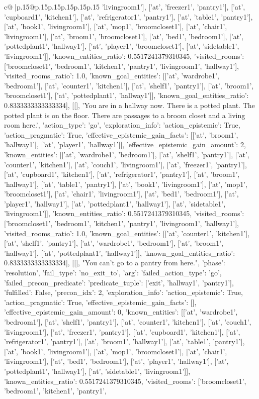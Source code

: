 \documentclass{article}
\begin{document}
{\begin{supertabular}{c@{$\;$}|p{.15\linewidth}@{}p{.15\linewidth}p{.15\linewidth}p{.15\linewidth}p{.15\linewidth}p{.15\linewidth}}
{{{'livingroom1'], ['at', 'freezer1', 'pantry1'], ['at', 'cupboard1', 'kitchen1'], ['at', 'refrigerator1', 'pantry1'], ['at', 'table1', 'pantry1'], ['at', 'book1', 'livingroom1'], ['at', 'mop1', 'broomcloset1'], ['at', 'chair1', 'livingroom1'], ['at', 'broom1', 'broomcloset1'], ['at', 'bed1', 'bedroom1'], ['at', 'pottedplant1', 'hallway1'], ['at', 'player1', 'broomcloset1'], ['at', 'sidetable1', 'livingroom1']], 'known_entities_ratio': 0.5517241379310345, 'visited_rooms': ['broomcloset1', 'bedroom1', 'kitchen1', 'pantry1', 'livingroom1', 'hallway1'], 'visited_rooms_ratio': 1.0, 'known_goal_entities': [['at', 'wardrobe1', 'bedroom1'], ['at', 'counter1', 'kitchen1'], ['at', 'shelf1', 'pantry1'], ['at', 'broom1', 'broomcloset1'], ['at', 'pottedplant1', 'hallway1']], 'known_goal_entities_ratio': 0.8333333333333334}}], [[], 'You are in a hallway now. There is a potted plant. The potted plant is on the floor. There are passages to a broom closet and a living room here.', {'action_type': 'go', 'exploration_info': {'action_epistemic': True, 'action_pragmatic': True, 'effective_epistemic_gain_facts': [['at', 'broom1', 'hallway1'], ['at', 'player1', 'hallway1']], 'effective_epistemic_gain_amount': 2, 'known_entities': [['at', 'wardrobe1', 'bedroom1'], ['at', 'shelf1', 'pantry1'], ['at', 'counter1', 'kitchen1'], ['at', 'couch1', 'livingroom1'], ['at', 'freezer1', 'pantry1'], ['at', 'cupboard1', 'kitchen1'], ['at', 'refrigerator1', 'pantry1'], ['at', 'broom1', 'hallway1'], ['at', 'table1', 'pantry1'], ['at', 'book1', 'livingroom1'], ['at', 'mop1', 'broomcloset1'], ['at', 'chair1', 'livingroom1'], ['at', 'bed1', 'bedroom1'], ['at', 'player1', 'hallway1'], ['at', 'pottedplant1', 'hallway1'], ['at', 'sidetable1', 'livingroom1']], 'known_entities_ratio': 0.5517241379310345, 'visited_rooms': ['broomcloset1', 'bedroom1', 'kitchen1', 'pantry1', 'livingroom1', 'hallway1'], 'visited_rooms_ratio': 1.0, 'known_goal_entities': [['at', 'counter1', 'kitchen1'], ['at', 'shelf1', 'pantry1'], ['at', 'wardrobe1', 'bedroom1'], ['at', 'broom1', 'hallway1'], ['at', 'pottedplant1', 'hallway1']], 'known_goal_entities_ratio': 0.8333333333333334}}], [[], "You can't go to a pantry from here.", {'phase': 'resolution', 'fail_type': 'no_exit_to', 'arg': {'failed_action_type': 'go', 'failed_precon_predicate': {'predicate_tuple': ['exit', 'hallway1', 'pantry1'], 'fulfilled': False, 'precon_idx': 2}}, 'exploration_info': {'action_epistemic': True, 'action_pragmatic': True, 'effective_epistemic_gain_facts': [], 'effective_epistemic_gain_amount': 0, 'known_entities': [['at', 'wardrobe1', 'bedroom1'], ['at', 'shelf1', 'pantry1'], ['at', 'counter1', 'kitchen1'], ['at', 'couch1', 'livingroom1'], ['at', 'freezer1', 'pantry1'], ['at', 'cupboard1', 'kitchen1'], ['at', 'refrigerator1', 'pantry1'], ['at', 'broom1', 'hallway1'], ['at', 'table1', 'pantry1'], ['at', 'book1', 'livingroom1'], ['at', 'mop1', 'broomcloset1'], ['at', 'chair1', 'livingroom1'], ['at', 'bed1', 'bedroom1'], ['at', 'player1', 'hallway1'], ['at', 'pottedplant1', 'hallway1'], ['at', 'sidetable1', 'livingroom1']], 'known_entities_ratio': 0.5517241379310345, 'visited_rooms': ['broomcloset1', 'bedroom1', 'kitchen1', 'pantry1', }}}
\end{supertabular}}
\end{document}
